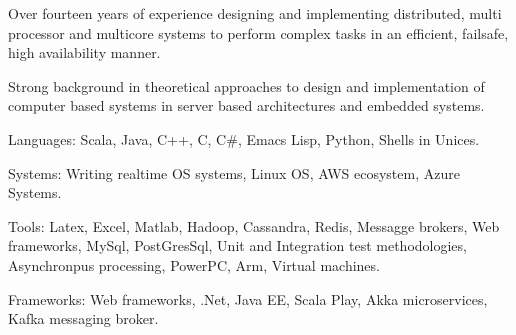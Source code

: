 

\begin{cventries}

\cventryOnlyDescription
      {\begin{cvitems} %
        \item {Over fourteen years of experience designing and implementing distributed, multi processor and multicore systems to perform complex tasks in an efficient, failsafe, high availability manner.}
        \item {Strong background in theoretical approaches to design and implementation of computer based systems in server based architectures and embedded systems.}
	\item {Languages: Scala, Java, C++, C, C\#, Emacs Lisp, Python, Shells in Unices.}
	\item {Systems: Writing realtime OS systems, Linux OS, AWS ecosystem, Azure Systems.}
	\item {Tools: Latex, Excel, Matlab, Hadoop, Cassandra, Redis, Messagge brokers, Web frameworks, MySql, PostGresSql, Unit and Integration test methodologies, Asynchronpus processing, PowerPC, Arm, Virtual machines.}
	\item {Frameworks: Web frameworks, .Net, Java EE, Scala Play, Akka microservices, Kafka messaging broker.}
       \end{cvitems}
      }
\end{cventries}
